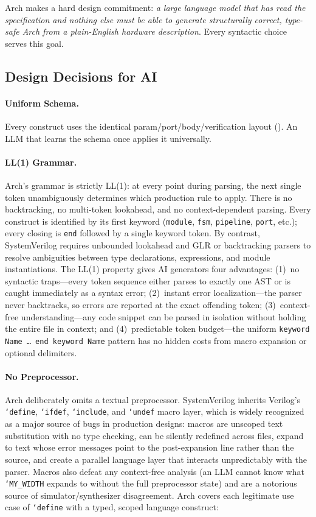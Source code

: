 \documentclass[11pt,twocolumn]{article}
\begin{document}
Arch makes a hard design commitment: \emph{a large language model that has read the specification and nothing else must be able to generate structurally correct, type-safe Arch from a plain-English hardware description}. Every syntactic choice serves this goal.

\subsection{Design Decisions for AI}

\paragraph{Uniform Schema.} Every construct uses the identical param/port/body/verification layout (). An LLM that learns the schema once applies it universally.

\paragraph{LL(1) Grammar.} Arch's grammar is strictly LL(1): at every point during parsing, the next single token unambiguously determines which production rule to apply. There is no backtracking, no multi-token lookahead, and no context-dependent parsing. Every construct is identified by its first keyword (\texttt{module}, \texttt{fsm}, \texttt{pipeline}, \texttt{port}, etc.); every closing is \texttt{end} followed by a single keyword token. By contrast, SystemVerilog requires unbounded lookahead and GLR or backtracking parsers to resolve ambiguities between type declarations, expressions, and module instantiations. The LL(1) property gives AI generators four advantages: (1)~no syntactic traps---every token sequence either parses to exactly one AST or is caught immediately as a syntax error; (2)~instant error localization---the parser never backtracks, so errors are reported at the exact offending token; (3)~context-free understanding---any code snippet can be parsed in isolation without holding the entire file in context; and (4)~predictable token budget---the uniform \texttt{keyword Name \ldots\ end keyword Name} pattern has no hidden costs from macro expansion or optional delimiters.

\paragraph{No Preprocessor.} Arch deliberately omits a textual preprocessor. SystemVerilog inherits Verilog's \texttt{`define}, \texttt{`ifdef}, \texttt{`include}, and \texttt{`undef} macro layer, which is widely recognized as a major source of bugs in production designs: macros are unscoped text substitution with no type checking, can be silently redefined across files, expand to text whose error messages point to the post-expansion line rather than the source, and create a parallel language layer that interacts unpredictably with the parser. Macros also defeat any context-free analysis (an LLM cannot know what \texttt{`MY\_WIDTH} expands to without the full preprocessor state) and are a notorious source of simulator/synthesizer disagreement. Arch covers each legitimate use case of \texttt{`define} with a typed, scoped language construct:
\end{document}
